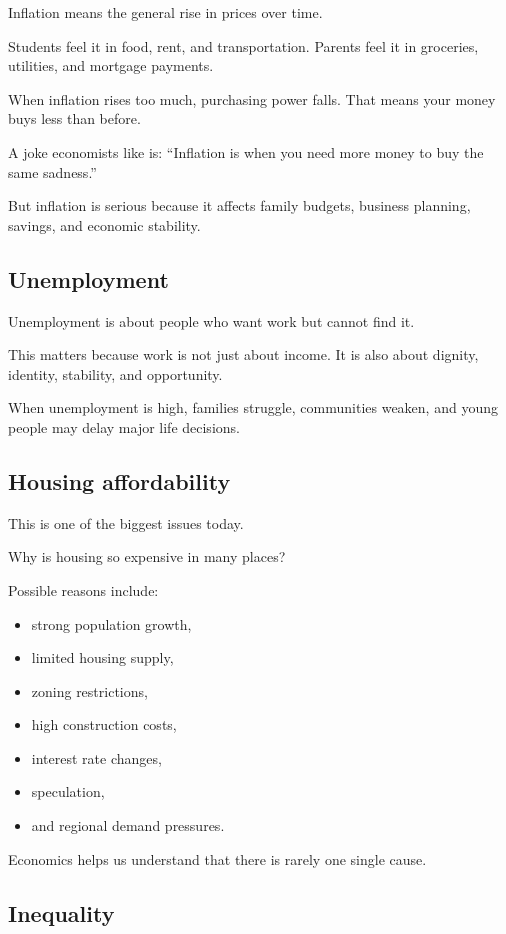 \documentclass[12pt]{article}
\begin{document}
Inflation means the general rise in prices over time.

Students feel it in food, rent, and transportation.  
Parents feel it in groceries, utilities, and mortgage payments.

When inflation rises too much, purchasing power falls.  
That means your money buys less than before.

A joke economists like is:  
``Inflation is when you need more money to buy the same sadness.''

But inflation is serious because it affects family budgets, business planning, savings, and economic stability.

\subsection*{Unemployment}

Unemployment is about people who want work but cannot find it.

This matters because work is not just about income.  
It is also about dignity, identity, stability, and opportunity.

When unemployment is high, families struggle, communities weaken, and young people may delay major life decisions.

\subsection*{Housing affordability}

This is one of the biggest issues today.

Why is housing so expensive in many places?

Possible reasons include:
\begin{itemize}[leftmargin=2em]
    \item strong population growth,
    \item limited housing supply,
    \item zoning restrictions,
    \item high construction costs,
    \item interest rate changes,
    \item speculation,
    \item and regional demand pressures.
\end{itemize}

Economics helps us understand that there is rarely one single cause.

\subsection*{Inequality}
\end{document}
